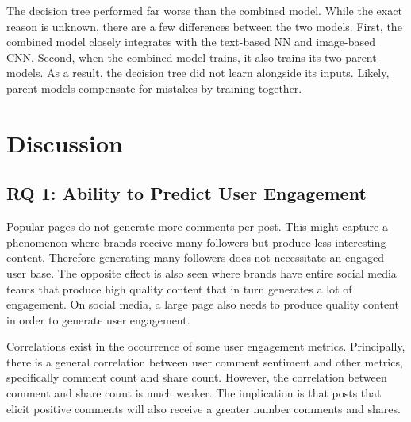 \documentclass[mksc,blindrev]{informs3} %
\begin{document}
The decision tree performed far worse than the combined model. While the exact reason is unknown, there are a few differences between the two models. First, the combined model closely integrates with the text-based NN and image-based CNN. Second, when the combined model trains, it also trains its two-parent models. As a result, the decision tree did not learn alongside its inputs. Likely, parent models compensate for mistakes by training together.

\section{Discussion}

\subsection{RQ 1: Ability to Predict User Engagement}

Popular pages do not generate more comments per post. This might capture a phenomenon where brands receive many followers but produce less interesting content. Therefore generating many followers does not necessitate an engaged user base. The opposite effect is also seen where brands have entire social media teams that produce high quality content that in turn generates a lot of engagement. On social media, a large page also needs to produce quality content in order to generate user engagement.

Correlations exist in the occurrence of some user engagement metrics. Principally, there is a general correlation between user comment sentiment and other metrics, specifically comment count and share count. However, the correlation between comment and share count is much weaker. The implication is that posts that elicit positive comments will also receive a greater number comments and shares. 

\end{document}
